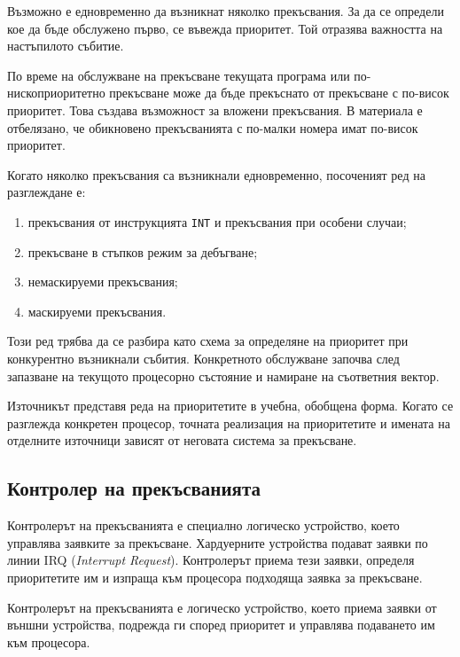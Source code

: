 Възможно е едновременно да възникнат няколко прекъсвания. За да се определи кое да бъде обслужено първо, се въвежда приоритет. Той отразява важността на настъпилото събитие.

По време на обслужване на прекъсване текущата програма или по-нископриоритетно прекъсване може да бъде прекъснато от прекъсване с по-висок приоритет. Това създава възможност за вложени прекъсвания. В материала е отбелязано, че обикновено прекъсванията с по-малки номера имат по-висок приоритет.

Когато няколко прекъсвания са възникнали едновременно, посоченият ред на разглеждане е:

\begin{enumerate}
    \item прекъсвания от инструкцията \verb|INT| и прекъсвания при особени случаи;
    \item прекъсване в стъпков режим за дебъгване;
    \item немаскируеми прекъсвания;
    \item маскируеми прекъсвания.
\end{enumerate}

Този ред трябва да се разбира като схема за определяне на приоритет при конкурентно възникнали събития. Конкретното обслужване започва след запазване на текущото процесорно състояние и намиране на съответния вектор.

\begin{remark}
Източникът представя реда на приоритетите в учебна, обобщена форма. Когато се разглежда конкретен процесор, точната реализация на приоритетите и имената на отделните източници зависят от неговата система за прекъсване.
\end{remark}

\subsection{Контролер на прекъсванията}\label{s:10.4.5}

Контролерът на прекъсванията е специално логическо устройство, което управлява заявките за прекъсване. Хардуерните устройства подават заявки по линии IRQ (\emph{Interrupt Request}). Контролерът приема тези заявки, определя приоритетите им и изпраща към процесора подходяща заявка за прекъсване.

\begin{defn}
Контролерът на прекъсванията е логическо устройство, което приема заявки от външни устройства, подрежда ги според приоритет и управлява подаването им към процесора.
\end{defn}

